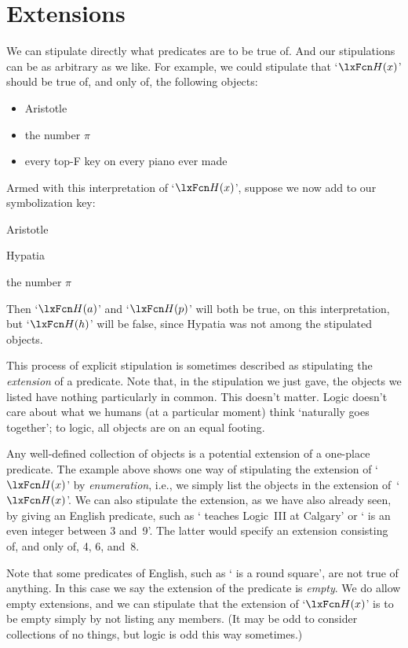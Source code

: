 \section{Extensions}\label{sec:extensions}
We can stipulate directly what predicates are to be true of. And our stipulations can be as arbitrary as we like. For example, we could stipulate that `$\atom{H}{x}$' should be true of, and only of, the following objects:
	\begin{itemize}
		\item Aristotle
		\item the number $\pi$
		\item every top-F key on every piano ever made
	\end{itemize}
Armed with this interpretation of `$\atom{H}{x}$', suppose we now add to our symbolization key:
	\begin{ekey}
		\item[a] Aristotle
		\item[h] Hypatia
		\item[p] the number $\pi$
	\end{ekey}
Then `$\atom{H}{a}$' and `$\atom{H}{p}$' will both be true, on this interpretation, but `$\atom{H}{h}$' will be false, since Hypatia was not among the stipulated objects.

This process of explicit stipulation is sometimes described as stipulating the \emph{extension} of a predicate. Note that, in the stipulation we just gave, the objects we listed have nothing particularly in common. This doesn't matter. Logic doesn't care about what we humans (at a particular moment) think `naturally goes together'; to logic, all objects are on an equal footing.

Any well-defined collection of objects is a potential extension of a one-place predicate.  The example above shows one way of stipulating the extension of `$\atom{H}{x}$' by \emph{enumeration}, i.e., we simply list the objects in the extension of~`$\atom{H}{x}$'. We can also stipulate the extension, as we have also already seen, by giving an English predicate, such as ` teaches Logic~III at Calgary' or ` is an even integer between 3 and~9'. The latter would specify an extension consisting of, and only of, 4, 6, and~8.

Note that some predicates of English, such as ` is a round square', are not true of anything.  In this case we say the extension of the predicate is \emph{empty}.  We do allow empty extensions, and we can stipulate that the extension of `$\atom{H}{x}$' is to be empty simply by not listing any members. (It may be odd to consider collections of no things, but logic is odd this way sometimes.)



